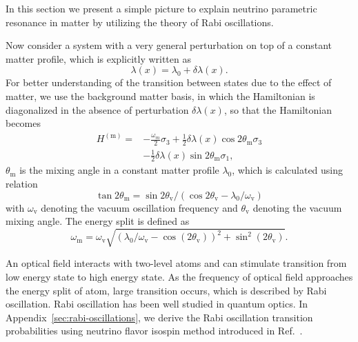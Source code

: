 \documentclass[%
reprint,
 amsmath,amssymb,
 aps,
]{revtex4-1}
\begin{document}
In this section we present a simple picture to explain neutrino parametric resonance in matter by utilizing the theory of Rabi oscillations.

Now consider a system with a very general perturbation on top of a constant matter profile, which is explicitly written as
\begin{equation}
    \lambda(x) = \lambda_0 + \delta \lambda(x).
    \label{eq-general-matter-profile}
\end{equation}
For better understanding of the transition between states due to the effect of matter, we use the background matter basis, in which the Hamiltonian is diagonalized in the absence of perturbation $\delta\lambda(x)$, so that the Hamiltonian becomes
\begin{align}
    H^{(\mathrm{m})} =& -\frac{\omega_m}{2} \sigma_3 + \frac{1}{2} \delta\lambda(x) \cos 2\theta_{\mathrm m} \sigma_3 \nonumber \\
    & - \frac{1}{2} \delta\lambda(x) \sin 2\theta_{\mathrm m} \sigma_1,
    \label{eq-hamiltonian-bg-matter-basis-general}
\end{align}
$\theta_{\mathrm m}$ is the mixing angle in a constant matter profile $\lambda_0$, which is calculated using relation
\begin{equation*}
\tan 2\theta_{\mathrm{m}}=\sin 2\theta_{\mathrm v}/\left( \cos 2\theta_{\mathrm v} - \lambda_0/\omega_{\mathrm v} \right)
\end{equation*}
with $\omega_{\mathrm v}$ denoting the vacuum oscillation frequency and $\theta_{\mathrm v}$ denoting the vacuum mixing angle. The energy split is defined as
\begin{equation}
\omega_{\mathrm{m}} = \omega_{\mathrm{v}} \sqrt{ ( \lambda_0/\omega_{\mathrm{v}} - \cos (2\theta_{\mathrm{v}}) )^2 + \sin^2(2\theta_{\mathrm{v}}) }.
\end{equation}




An optical field interacts with two-level atoms and can stimulate transition from low energy state to high energy state. As the frequency of optical field approaches the energy split of atom, large transition occurs, which is described by Rabi oscillation. Rabi oscillation has been well studied in quantum optics.\cite{Boyd2008} In Appendix~\ref{sec:rabi-oscillations}, we derive the Rabi oscillation transition probabilities using neutrino flavor isospin method introduced in Ref.~.
\end{document}
